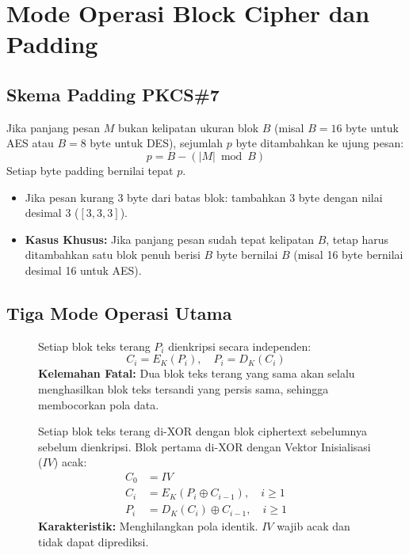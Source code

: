 \documentclass[11pt,a4paper]{article}
\begin{document}
\newpage
\section{Mode Operasi Block Cipher dan Padding}

\subsection{Skema Padding PKCS\#7}
Jika panjang pesan $M$ bukan kelipatan ukuran blok $B$ (misal $B = 16$ byte untuk AES atau $B = 8$ byte untuk DES), sejumlah $p$ byte ditambahkan ke ujung pesan:
\begin{equation}
p = B - (|M| \bmod B)
\end{equation}
Setiap byte padding bernilai tepat $p$.
\begin{itemize}[leftmargin=*]
    \item Jika pesan kurang 3 byte dari batas blok: tambahkan 3 byte dengan nilai desimal 3 ($[3, 3, 3]$).
    \item \textbf{Kasus Khusus:} Jika panjang pesan sudah tepat kelipatan $B$, tetap harus ditambahkan satu blok penuh berisi $B$ byte bernilai $B$ (misal 16 byte bernilai desimal 16 untuk AES).
\end{itemize}

\subsection{Tiga Mode Operasi Utama}

\begin{figure}[H]
\centering
\begin{tcolorbox}[title=1. Electronic Codebook (ECB) -- \textbf{TIDAK AMAN}]
Setiap blok teks terang $P_i$ dienkripsi secara independen:
\begin{equation}
C_i = E_K(P_i), \quad P_i = D_K(C_i)
\end{equation}
\textbf{Kelemahan Fatal:} Dua blok teks terang yang sama akan selalu menghasilkan blok teks tersandi yang persis sama, sehingga membocorkan pola data.
\end{tcolorbox}
\end{figure}

\begin{figure}[H]
\centering
\begin{tcolorbox}[title=2. Cipher Block Chaining (CBC)]
Setiap blok teks terang di-XOR dengan blok ciphertext sebelumnya sebelum dienkripsi. Blok pertama di-XOR dengan Vektor Inisialisasi ($IV$) acak:
\begin{align}
C_0 &= IV \\
C_i &= E_K(P_i \oplus C_{i-1}), \quad i \ge 1 \\
P_i &= D_K(C_i) \oplus C_{i-1}, \quad i \ge 1
\end{align}
\textbf{Karakteristik:} Menghilangkan pola identik. $IV$ wajib acak dan tidak dapat diprediksi.
\end{tcolorbox}
\end{figure}
\end{document}
